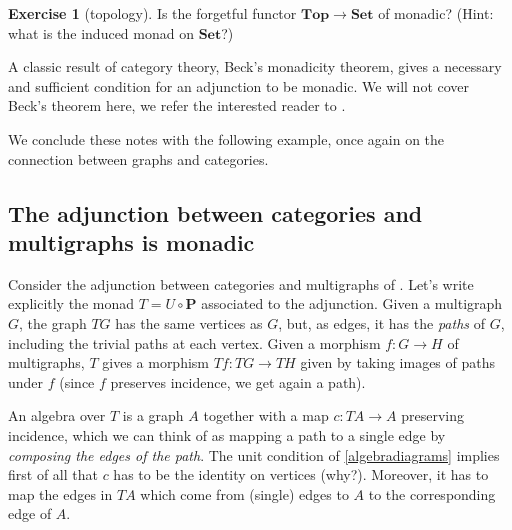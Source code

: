 \documentclass[a4paper,11pt,oneside]{scrbook}
\numberwithin{equation}{section}
\theoremstyle{plain}
\theoremstyle{definition}
\newtheorem{ex}[thm]{Exercise}
\newcommand{\cat}[1]{{\mathbf{#1}}} %
\DeclareMathOperator{\1}{\mathbbm{1}}
\DeclareMathOperator{\2}{\mathbbm{2}}
\begin{document}
\begin{ex}[topology]
 Is the forgetful functor $\cat{Top}\to\cat{Set}$ of  monadic? (Hint: what is the induced monad on $\cat{Set}$?)
\end{ex}



A classic result of category theory, Beck's monadicity theorem, gives a necessary and sufficient condition for an adjunction to be monadic. We will not cover Beck's theorem here, we refer the interested reader to \cite[Chapter~5]{ctcontext}. 

We conclude these notes with the following example, once again on the connection between graphs and categories.

\subsection{The adjunction between categories and multigraphs is monadic}\label{catgraphmonadic}

Consider the adjunction between categories and multigraphs of .
 Let's write explicitly the monad $T=U\circ\cat{P}$ associated to the adjunction. 
 Given a multigraph $G$, the graph $TG$ has the same vertices as $G$, but, as edges, it has the \emph{paths} of $G$, including the trivial paths at each vertex. Given a morphism $f:G\to H$ of multigraphs, $T$ gives a morphism $Tf:TG\to TH$ given by taking images of paths under $f$ (since $f$ preserves incidence, we get again a path). 
 
 An algebra over $T$ is a graph $A$ together with a map $c:TA\to A$ preserving incidence, which we can think of as mapping a path to a single edge by \emph{composing the edges of the path}. The unit condition of \eqref{algebradiagrams} implies first of all that $c$ has to be the identity on vertices (why?). Moreover, it has to map the edges in $TA$ which come from (single) edges to $A$ to the corresponding edge of $A$.
 
\end{document}
